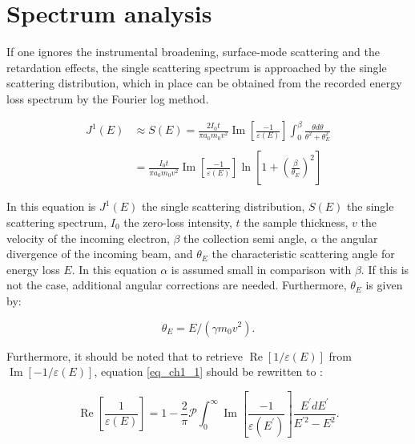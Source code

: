 \documentclass{article}
\begin{document}
\section{Spectrum analysis}
If one ignores the instrumental broadening, surface-mode scattering and the retardation effects, the single scattering spectrum is approached by the single scattering distribution, which in place can be obtained from the recorded energy loss spectrum by the Fourier log method. \cite{egerton_2011}

\begin{equation}\label{eq_S_E}
\begin{aligned}
J^{1}(E) & \approx S(E)=\frac{2 I_{0} t}{\pi a_{0} m_{0} v^{2}} \operatorname{Im}\left[\frac{-1}{\varepsilon(E)}\right] \int_{0}^{\beta} \frac{\theta d \theta}{\theta^{2}+\theta_{E}^{2}} \\
\\
&=\frac{I_{0} t}{\pi a_{0} m_{0} v^{2}} \operatorname{Im}\left[\frac{-1}{\varepsilon(E)}\right] \ln \left[1+\left(\frac{\beta}{\theta_{E}}\right)^{2}\right]
\end{aligned}
\end{equation}

In this equation is $J^1(E)$ the single scattering distribution, $S(E)$ the single scattering spectrum, $I_0$ the zero-loss intensity, $t$ the sample thickness, $v$ the velocity of the incoming electron, $\beta$ the collection semi angle, $\alpha$ the angular divergence of the incoming beam, and $\theta_E$ the characteristic scattering angle for energy loss $E$. In this equation $\alpha$ is assumed small in comparison with $\beta$. If this is not the case, additional angular corrections are needed. Furthermore, $\theta_E$ is given by:

\begin{equation} \label{eq_th_E}
    \theta_E = E/(\gamma m_0v^2) .
\end{equation}


Furthermore, it should be noted that to retrieve $\operatorname{Re}\left[1/\varepsilon(E)\right]$ from $\operatorname{Im}\left[-1/\varepsilon(E)\right]$, equation \eqref{eq_ch1_1} should be rewritten to \cite{Dapor2017}:

\begin{equation}\label{eq_kkr_eps}
    \operatorname{Re}\left[\frac{1}{\varepsilon(E)}\right]=1-\frac{2}{\pi} \mathcal{P} \int_{0}^{\infty} \operatorname{Im}\left[\frac{-1}{\varepsilon\left(E^{\prime}\right)}\right] \frac{E^{\prime} d E^{\prime}}{E^{\prime 2}-E^{2}}.
\end{equation}
\end{document}
